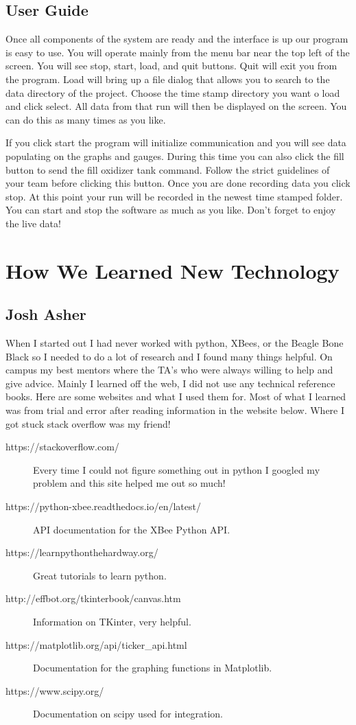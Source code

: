 \documentclass[10pt,draftclsnofoot,onecolumn,retainorgcmds]{IEEEtran}
\begin{document}
\subsection{User Guide}
Once all components of the system are ready and the interface is up our program is easy to use. You will operate mainly from the menu bar near the top left of the screen. You will see stop, start, load, and quit buttons. Quit will exit you from the program. Load will bring up a file dialog that allows you to search to the data directory of the project. Choose the time stamp directory you want o load and click select. All data from that run will then be displayed on the screen. You can do this as many times as you like. \par
If you click start the program will initialize communication and you will see data populating on the graphs and gauges. During this time you can also click the fill button to send the fill oxidizer tank command. Follow the strict guidelines of your team before clicking this button. Once you are done recording data you click stop. At this point your run will be recorded in the newest time stamped folder. You can start and stop the software as much as you like. Don't forget to enjoy the live data! \par


\section{How We Learned New Technology}
\subsection{Josh Asher}
When I started out I had never worked with python, XBees, or the Beagle Bone Black so I needed to do a lot of research and I found many things helpful. On campus my best mentors where the TA's who were always willing to help and give advice. Mainly I learned off the web, I did not use any technical reference books. Here are some websites and what I used them for. Most of what I learned was from trial and error after reading information in the website below. Where I got stuck stack overflow was my friend! \par 

\begin{description}
	\item[https://stackoverflow.com/] Every time I could not figure something out in python I googled my problem and this site helped me out so much!
	\item[https://python-xbee.readthedocs.io/en/latest/] API documentation for the XBee Python API.
	\item[https://learnpythonthehardway.org/] Great tutorials to learn python.
	\item[http://effbot.org/tkinterbook/canvas.htm] Information on TKinter, very helpful.
	\item[https://matplotlib.org/api/ticker\_api.html] Documentation for the graphing functions in Matplotlib.
	\item[https://www.scipy.org/] Documentation on scipy used for integration.
\end{description}
\end{document}
